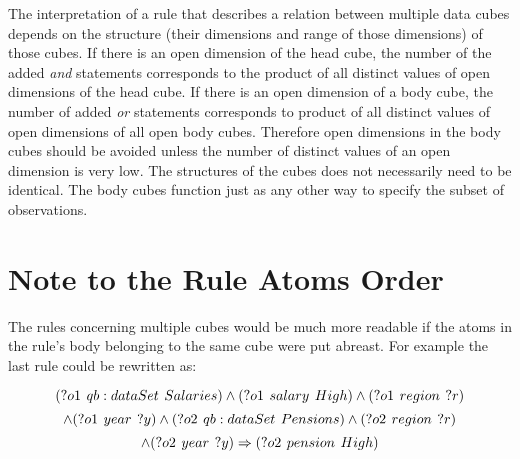The interpretation of a rule that describes a relation between multiple data cubes depends on the structure (their dimensions and range of those dimensions) of those cubes. If there is an open dimension of the head cube, the number of the added \textit{and} statements corresponds to the product of all distinct values of open dimensions of the head cube. If there is an open dimension of a body cube, the number of added \textit{or} statements corresponds to product of all distinct values of open dimensions of all open body cubes. Therefore open dimensions in the body cubes should be avoided unless the number of distinct values of an open dimension is very low. The structures of the cubes does not necessarily need to be identical. The body cubes function just as any other way to specify the subset of observations.

\section{Note to the Rule Atoms Order\label{note}}

The rules concerning multiple cubes would be much more readable if the atoms in the rule's body belonging to the same cube were put abreast. For example the last rule could be rewritten as:

\begin{minipage}{\textwidth}
$$
(?o1\hspace{0.4em}qb:dataSet\hspace{0.4em}Salaries) \land (?o1\hspace{0.4em}salary\hspace{0.4em}High) \land (?o1\hspace{0.4em}region\hspace{0.4em}?r) 
$$
$$
\land (?o1\hspace{0.4em}year\hspace{0.4em}?y) \land (?o2\hspace{0.4em}qb:dataSet\hspace{0.4em}Pensions) \land (?o2\hspace{0.4em}region\hspace{0.4em}?r)
$$
$$
\land (?o2\hspace{0.4em}year\hspace{0.4em}?y) \Rightarrow (?o2\hspace{0.4em}pension\hspace{0.4em}High)
$$
\end{minipage}

